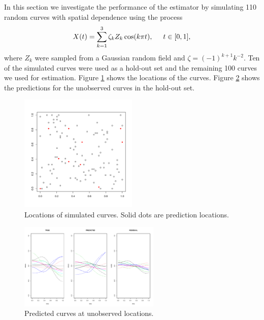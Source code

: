 In this section we investigate the performance of the estimator by simulating 110 random curves with spatial dependence using the process
\begin{equation}
X(t) = \sum^{3}_{k=1}\zeta_k Z_k \cos(k\pi t), \hspace{0.5cm} t \in [0,1],
\label{eq:sim process2}
\end{equation}
where $Z_k$ were sampled from a Gaussian random field and \(\zeta=(-1)^{k+1}k^{-2}\). Ten of the simulated curves were used as a hold-out set and the remaining 100 curves we used for estimation. Figure \ref{fig:locations} shows the locations of the curves. Figure \ref{fig:curve kriging predictions} shows the predictions for the unobserved curves in the hold-out set. 

\begin{figure}
\begin{center}
\includegraphics[width=0.5\textwidth]{images/kriging/locations.pdf}
\end{center}
\caption{Locations of simulated curves. Solid dots are prediction locations.}
\label{fig:locations}
\end{figure}

\begin{figure}
\begin{center}
\includegraphics[width=0.6\textwidth]{images/kriging/residual-curves.pdf}
\end{center}
\caption{Predicted curves at unobserved locations. }
\label{fig:curve kriging predictions}
\end{figure}


